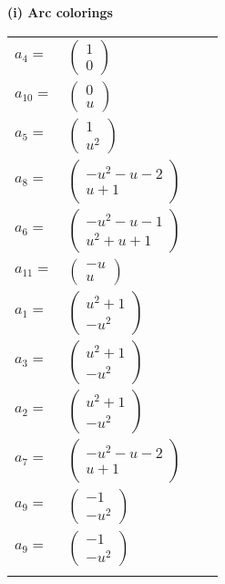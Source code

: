 \documentclass[1p]{elsarticle_modified}
\theoremstyle{definition}
\begin{document}
\flushleft \textbf{(i) Arc colorings}\\
\begin{tabular}{m{7pt} m{180pt} m{7pt} m{180pt} }
\flushright $a_{4}=$&$\begin{pmatrix}1\\0\end{pmatrix}$ \\
\flushright $a_{10}=$&$\begin{pmatrix}0\\u\end{pmatrix}$ \\
\flushright $a_{5}=$&$\begin{pmatrix}1\\u^2\end{pmatrix}$ \\
\flushright $a_{8}=$&$\begin{pmatrix}- u^2- u-2\\u+1\end{pmatrix}$ \\
\flushright $a_{6}=$&$\begin{pmatrix}- u^2- u-1\\u^2+u+1\end{pmatrix}$ \\
\flushright $a_{11}=$&$\begin{pmatrix}- u\\u\end{pmatrix}$ \\
\flushright $a_{1}=$&$\begin{pmatrix}u^2+1\\- u^2\end{pmatrix}$ \\
\flushright $a_{3}=$&$\begin{pmatrix}u^2+1\\- u^2\end{pmatrix}$ \\
\flushright $a_{2}=$&$\begin{pmatrix}u^2+1\\- u^2\end{pmatrix}$ \\
\flushright $a_{7}=$&$\begin{pmatrix}- u^2- u-2\\u+1\end{pmatrix}$ \\
\flushright $a_{9}=$&$\begin{pmatrix}-1\\- u^2\end{pmatrix}$\\ \flushright $a_{9}=$&$\begin{pmatrix}-1\\- u^2\end{pmatrix}$\\&\end{tabular}
\end{document}
